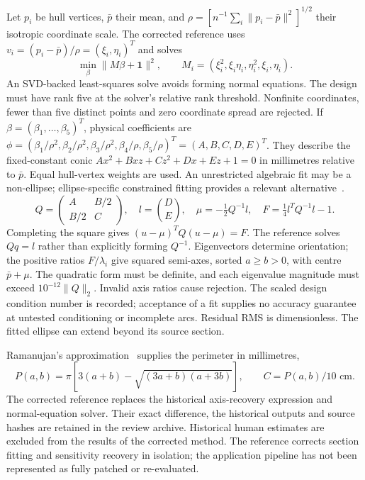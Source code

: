 \documentclass[11pt,a4paper]{article}
\begin{document}
Let $p_i$ be hull vertices, $\bar p$ their mean, and
$\rho=[n^{-1}\sum_i\|p_i-\bar p\|^2]^{1/2}$ their isotropic coordinate scale.
The corrected reference uses $v_i=(p_i-\bar p)/\rho=(\xi_i,\eta_i)^T$ and solves
\begin{equation}
 \min_\beta\|M\beta+\mathbf1\|^2,\qquad
 M_i=(\xi_i^2,\xi_i\eta_i,\eta_i^2,\xi_i,\eta_i).
 \label{eq:fit}
\end{equation}
An SVD-backed least-squares solve avoids forming normal equations. The design must have rank five at the solver's relative rank threshold. Nonfinite coordinates, fewer than five distinct points and zero coordinate spread are rejected. If $\beta=(\beta_1,\ldots,\beta_5)^T$, physical coefficients are
$\phi=(\beta_1/\rho^2,\beta_2/\rho^2,\beta_3/\rho^2,\beta_4/\rho,\beta_5/\rho)^T=(A,B,C,D,E)^T$.
They describe the fixed-constant conic $Ax^2+Bxz+Cz^2+Dx+Ez+1=0$ in millimetres relative to $\bar p$. Equal hull-vertex weights are used. An unrestricted algebraic fit may be a non-ellipse; ellipse-specific constrained fitting provides a relevant alternative~\cite{fitzgibbon1999direct}.
\begin{equation}
 Q=\begin{pmatrix}A&B/2\\B/2&C\end{pmatrix},\quad l=\binom DE,
 \quad \mu=-\tfrac12Q^{-1}l,\quad
 F=\tfrac14l^TQ^{-1}l-1.
 \label{eq:recover}
\end{equation}
Completing the square gives $(u-\mu)^TQ(u-\mu)=F$. The reference solves $Qq=l$ rather than explicitly forming $Q^{-1}$. Eigenvectors determine orientation; the positive ratios $F/\lambda_i$ give squared semi-axes, sorted $a\geq b>0$, with centre $\bar p+\mu$. The quadratic form must be definite, and each eigenvalue magnitude must exceed $10^{-12}\|Q\|_2$. Invalid axis ratios cause rejection. The scaled design condition number is recorded; acceptance of a fit supplies no accuracy guarantee at untested conditioning or incomplete arcs. Residual RMS is dimensionless. The fitted ellipse can extend beyond its source section.

Ramanujan's approximation~\cite{ramanujan1914modular} supplies the perimeter in millimetres,
\begin{equation}
 P(a,b)=\pi[3(a+b)-\sqrt{(3a+b)(a+3b)}],\qquad C=P(a,b)/10\text{ cm}.
 \label{eq:perimeter}
\end{equation}
The corrected reference replaces the historical axis-recovery expression and normal-equation solver. Their exact difference, the historical outputs and source hashes are retained in the review archive. Historical human estimates are excluded from the results of the corrected method. The reference corrects section fitting and sensitivity recovery in isolation; the application pipeline has not been represented as fully patched or re-evaluated.
\end{document}
